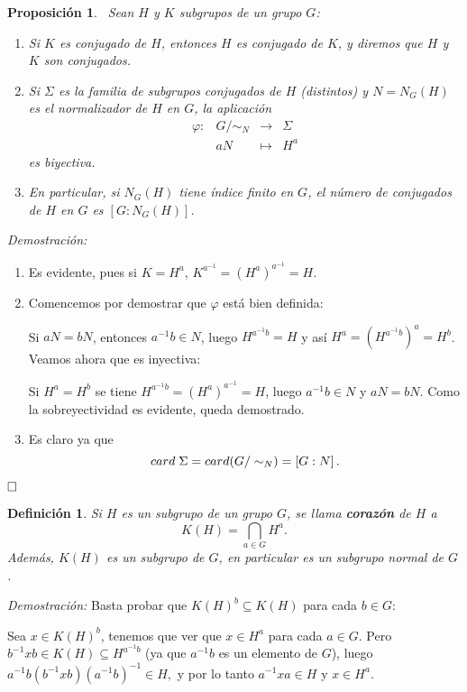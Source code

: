 \documentclass[12pt]{article}
\newtheorem{proposition}[theorem]{Proposición}
\newtheorem{definition}[theorem]{Definición}
\begin{document}
\begin{proposition}~\label{eq:conjug}Sean $H$ y $K$ subgrupos de un grupo $G$:
\begin{enumerate}
\item Si $K$ es conjugado de $H$, entonces $H$ es conjugado de $K$, y diremos que $H$ y $K$ son \textit{conjugados}.
\item Si $\Sigma$ es la familia de subgrupos conjugados de $H$ (distintos) y $N = N_{G}(H)$ es el normalizador de $H$ en $G$, la aplicación $$
\begin{array}{rccl}
\varphi \colon &G/\sim_{N} & \longrightarrow & \Sigma\\
&aN & \longmapsto &H^{a}
\end{array}
$$ es biyectiva.
\item En particular, si $N_{G}(H)$ tiene índice finito en $G$, el número de conjugados de $H$ en $G$ es $\left[ G:N_{G}(H) \right]$.
\end{enumerate}
\end{proposition}
\emph{Demostración: }\begin{enumerate}
\item Es evidente, pues si $K = H^{a}$, $K^{a^{-1}} =(H^{a})^{a^{-1}} = H$.
\item Comencemos por demostrar que $\varphi$ está bien definida:

Si $aN = bN$, entonces $a^{-1}b \in N$, luego $H^{a^{-1}b} = H$ y así $H^{a} = (H^{a^{-1}b})^{a} = H^{b}$. Veamos ahora que es inyectiva: 

Si $H^{a} = H^{b}$ se tiene $H^{a^{-1}b} = (H^{a})^{a^{-1}} = H$, luego $a^{-1}b \in N$ y $aN = bN.$ Como la sobreyectividad es evidente, queda demostrado.
\item  Es claro ya que $$card\hspace{0.1cm} \Sigma = card(G/\sim_{N}) = \left[ G:N \right].$$
\end{enumerate}
$\hfill \square$

\begin{definition}Si $H$ es un subgrupo de un grupo $G$, se llama \textbf{corazón} de $H$ a $$K(H) = \bigcap_{a \in G} H^{a}. \label{eq:corazon}$$ Además, $K(H)$ es un subgrupo de $G$, en particular es un subgrupo normal de $G$.
\end{definition}
\emph{Demostración: }Basta probar que $K(H)^{b} \subseteq K(H)$ para cada $b \in G$:

Sea $x \in K(H)^{b}$, tenemos que ver que $x \in H^{a}$ para cada $a \in G$. Pero $
b^{-1}xb \in K(H) \subseteq H^{a^{-1}b}$ (ya que $a^{-1}b$ es un elemento de $G$), luego $a^{-1}b(b^{-1}xb)(a^{-1}b)^{-1} \in H,$ y por lo tanto $a^{-1}xa \in H$ y $x\in H^{a}$.
\end{document}
